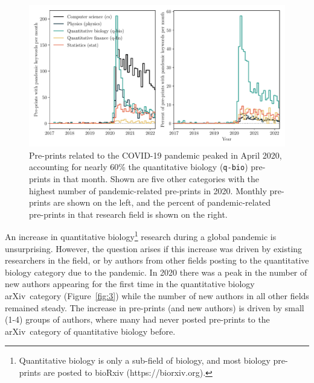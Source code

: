 \documentclass[]{rsos}%
\newcommand{\arxiv}{arXiv}
\newcommand{\change}[1]{#1}
\begin{document}
\begin{figure}
 \includegraphics[width=\linewidth]{pandemic-related-preprints}
\caption{Pre-prints related to the COVID-19 pandemic peaked in April 2020, accounting for nearly 60\% the quantitative biology (\texttt{q-bio}) pre-prints in that month. Shown are five other categories with the highest number of pandemic-related pre-prints in 2020. Monthly pre-prints are shown on the left, and the percent of pandemic-related pre-prints in that research field is shown on the right.}
\label{fig:2}
\end{figure}
 
\renewcommand{\thefootnote}{$\dagger$} 
 
An increase in quantitative biology\footnote{Quantitative biology is only a sub-field of biology, and most biology pre-prints are posted to bioRxiv ({https://biorxiv.org}).} research during a global pandemic is unsurprising. However, the question arises if this increase was driven by existing researchers in the field, or by authors from other fields \change{posting to the quantitative biology category} due to the pandemic. In 2020 there was a peak in the number of new authors appearing for the first time in the quantitative biology \change{\arxiv\ category} (Figure~\ref{fig:3}) while the number of new authors in all other fields remained steady. The increase in pre-prints (and new authors) is driven by small (1-4) groups of authors, where many had never posted pre-prints to \change{the \arxiv\ category of quantitative biology} before.
\end{document}
